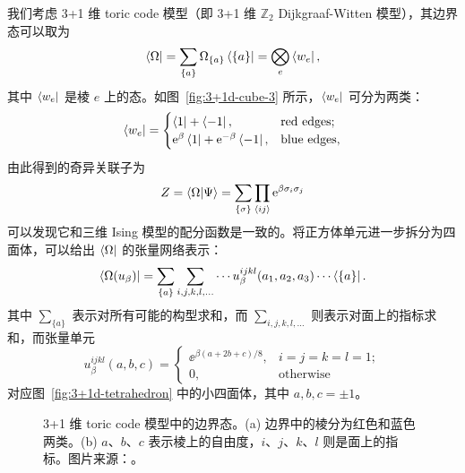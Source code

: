 我们考虑 3+1 维 toric code 模型（即 3+1 维 $\mathbb{Z}_2$ Dijkgraaf-Witten 模型）\cite{hamma2005string,zhao2022string}，其边界态可以取为
\begin{equation}
  \bra{\Omega} = \sum_{\{a\}} \Omega_{\{a\}} \bra{\{a\}} = \bigotimes_e \bra{w_e},
\end{equation}
其中 $\bra{w_e}$ 是棱 $e$ 上的态。如图~\ref{fig:3+1d-cube-3} 所示，$\bra{w_e}$ 可分为两类：
\begin{equation}
  \bra{w_e} = \begin{cases}
    \bra{1} + \bra{-1}, & \text{red edges}; \\
    \ee^\beta \bra{1} + \ee^{-\beta} \bra{-1}, & \text{blue edges},
  \end{cases}
\end{equation}
由此得到的奇异关联子为
\begin{equation}
  Z = \langle\Omega|\Psi\rangle = \sum_{\{\sigma\}} \prod_{\ev{ij}} \ee^{\beta \sigma_i \sigma_j}
\end{equation}
可以发现它和三维 Ising 模型的配分函数是一致的。将正方体单元进一步拆分为四面体，可以给出 $\bra{\Omega}$ 的张量网络表示：
\begin{equation}
  \bra{\Omega(u_\beta)} = \sum_{\{a\}} \sum_{i,j,k,l,\dots} \cdots u_\beta^{ijkl} (a_1,a_2,a_3) \cdots \bra{\{a\}}.
\end{equation}
其中 $\sum_{\{a\}}$ 表示对所有可能的构型求和，而 $\sum_{i,j,k,l,\dots}$ 则表示对面上的指标求和，而张量单元
\begin{equation}
  u_\beta^{ijkl} (a,b,c) = \begin{cases}
    \ee^{\beta(a+2b+c)/8}, & i=j=k=l=1; \\
    0, & \text{otherwise}
  \end{cases}
\end{equation}
对应图~\ref{fig:3+1d-tetrahedron} 中的小四面体，其中 $a,b,c=\pm1$。

\begin{figure}[htb]
  \centering
   \qquad
  \caption[3+1 维 toric code 模型中的边界态]{3+1 维 toric code 模型中的边界态。(a) 边界中的棱分为红色和蓝色两类。(b) $a$、$b$、$c$ 表示棱上的自由度，$i$、$j$、$k$、$l$ 则是面上的指标。图片来源：\parencite{chen2022exact}。}
\end{figure}

